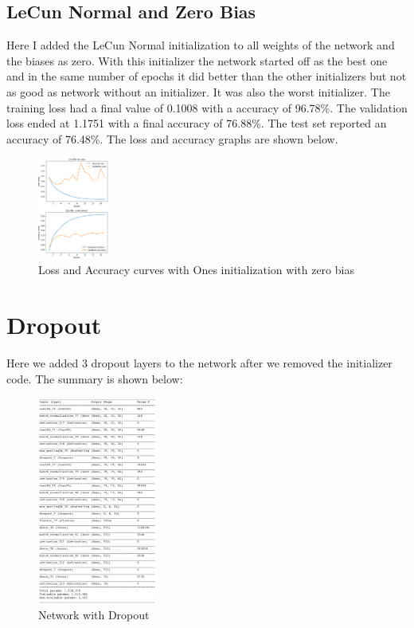 \documentclass[conference]{IEEEtran}
\begin{document}
    \subsection{LeCun Normal and Zero Bias}

    Here I added the LeCun Normal initialization to all weights of the network and the biases as zero. With this initializer
    the network started off as the best one and in the same number of epochs it did better than the other initializers but not as good as network without an 
    initializer. It was also the worst initializer. The training loss had a final value of 0.1008 with a accuracy of 96.78\%. The validation loss
    ended at 1.1751 with a final accuracy of 76.88\%. The test set reported an accuracy of 76.48\%. The loss and accuracy
    graphs are shown below.

    \begin{figure}[H]
        \centering
        \captionsetup{justification=centering}
        \centering
            \includegraphics[width=0.21\textwidth]{11.png}
            \caption{Loss and Accuracy curves with Ones initialization with zero bias}
    \end{figure}

    \section{Dropout}

    Here we added 3 dropout layers to the network after we removed the initializer code. The summary is shown below:

    \begin{figure}[H]
        \centering
        \captionsetup{justification=centering}
        \centering
            \includegraphics[width=0.35\textwidth]{12.png}
            \caption{Network with Dropout}
    \end{figure}
\end{document}
